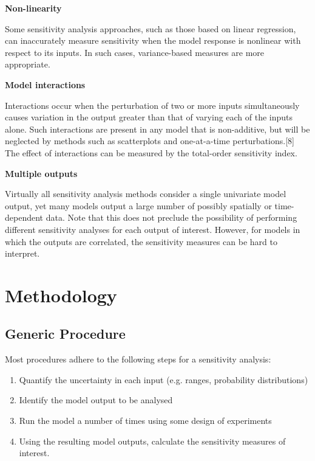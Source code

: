 \textbf{Non-linearity}

Some sensitivity analysis approaches, such as those based on linear regression, can inaccurately measure sensitivity when the model response is nonlinear with respect to its inputs. In such cases, variance-based measures are more appropriate.

\textbf{Model interactions }

Interactions occur when the perturbation of two or more inputs simultaneously causes variation in the output greater than that of varying each of the inputs alone. Such interactions are present in any model that is non-additive, but will be neglected by methods such as scatterplots and one-at-a-time perturbations.[8] The effect of interactions can be measured by the total-order sensitivity index.

\textbf{Multiple outputs}

Virtually all sensitivity analysis methods consider a single univariate model output, yet many models output a large number of possibly spatially or time-dependent data. Note that this does not preclude the possibility of performing different sensitivity analyses for each output of interest. However, for models in which the outputs are correlated, the sensitivity measures can be hard to interpret.


\section{Methodology}

\subsection{Generic Procedure}
Most procedures adhere to the following steps for a sensitivity analysis:

\begin{enumerate}

\item Quantify the uncertainty in each input (e.g. ranges, probability distributions)

\item Identify the model output to be analysed 

\item Run the model a number of times using some design of experiments

\item Using the resulting model outputs, calculate the sensitivity measures of interest.

\end{enumerate}

